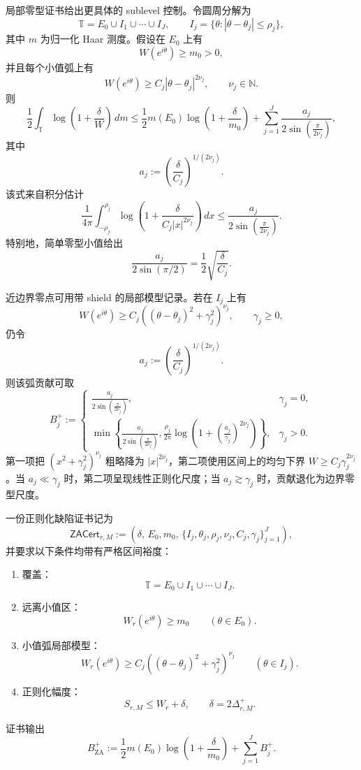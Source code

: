 局部零型证书给出更具体的 sublevel 控制。令圆周分解为
\[
\mathbb T=E_0\cup I_1\cup\cdots\cup I_J,
\qquad
I_j=\{\theta:|\theta-\theta_j|\le\rho_j\},
\]
其中 \(m\) 为归一化 Haar 测度。假设在 \(E_0\) 上有
\[
W(e^{i\theta})\ge m_0>0,
\]
并且每个小值弧上有
\[
W(e^{i\theta})
\ge
C_j|\theta-\theta_j|^{2\nu_j},
\qquad
\nu_j\in\mathbb{N}.
\]
则
\[
\frac12\int_{\mathbb T}
\log\left(1+\frac{\delta}{W}\right)\,dm
\le
\frac12m(E_0)\log\left(1+\frac{\delta}{m_0}\right)
+
\sum_{j=1}^J
\frac{a_j}{2\sin\left(\frac{\pi}{2\nu_j}\right)},
\]
其中
\[
a_j:=\left(\frac{\delta}{C_j}\right)^{1/(2\nu_j)}.
\]
该式来自积分估计
\[
\frac1{4\pi}
\int_{-\rho_j}^{\rho_j}
\log\left(1+\frac{\delta}{C_j|x|^{2\nu_j}}\right)\,dx
\le
\frac{a_j}{2\sin\left(\frac{\pi}{2\nu_j}\right)}.
\]
特别地，简单零型小值给出
\[
\frac{a_j}{2\sin(\pi/2)}
=
\frac12\sqrt{\frac{\delta}{C_j}}.
\]

近边界零点可用带 shield 的局部模型记录。若在 \(I_j\) 上有
\[
W(e^{i\theta})
\ge
C_j\left((\theta-\theta_j)^2+\gamma_j^2\right)^{\nu_j},
\qquad
\gamma_j\ge0,
\]
仍令
\[
a_j:=\left(\frac{\delta}{C_j}\right)^{1/(2\nu_j)}.
\]
则该弧贡献可取
\[
B_j^+
:=
\begin{cases}
\displaystyle
\frac{a_j}{2\sin\left(\frac{\pi}{2\nu_j}\right)},
& \gamma_j=0,\\[1.2em]
\displaystyle
\min\left\{
\frac{a_j}{2\sin\left(\frac{\pi}{2\nu_j}\right)},
\frac{\rho_j}{2\pi}
\log\left(1+\left(\frac{a_j}{\gamma_j}\right)^{2\nu_j}\right)
\right\},
& \gamma_j>0.
\end{cases}
\]
第一项把 \((x^2+\gamma_j^2)^{\nu_j}\) 粗略降为 \(|x|^{2\nu_j}\)，第二项使用区间上的均匀下界 \(W\ge C_j\gamma_j^{2\nu_j}\)。当 \(a_j\ll\gamma_j\) 时，第二项呈现线性正则化尺度；当 \(a_j\gtrsim\gamma_j\) 时，贡献退化为边界零型尺度。

\begin{definition}[零点敏感正则化证书]\label{def:typed-address-biaxial-completion-zero-aware-regularization-certificate}
一份正则化缺陷证书记为
\[
\mathsf{ZACert}_{r,M}
:=
\left(
\delta,\,
E_0,m_0,\,
\{I_j,\theta_j,\rho_j,\nu_j,C_j,\gamma_j\}_{j=1}^J
\right),
\]
并要求以下条件均带有严格区间裕度：
\begin{enumerate}
  \item 覆盖：
  \[
  \mathbb T=E_0\cup I_1\cup\cdots\cup I_J.
  \]
  \item 远离小值区：
  \[
  W_r(e^{i\theta})\ge m_0
  \qquad(\theta\in E_0).
  \]
  \item 小值弧局部模型：
  \[
  W_r(e^{i\theta})
  \ge
  C_j\left((\theta-\theta_j)^2+\gamma_j^2\right)^{\nu_j}
  \qquad(\theta\in I_j).
  \]
  \item 正则化幅度：
  \[
  S_{r,M}\le W_r+\delta,
  \qquad
  \delta=2\Delta_{r,M}^+.
  \]
\end{enumerate}
证书输出
\[
B_{\mathrm{ZA}}^+
:=
\frac12m(E_0)\log\left(1+\frac{\delta}{m_0}\right)
+
\sum_{j=1}^J B_j^+.
\]
\end{definition}

